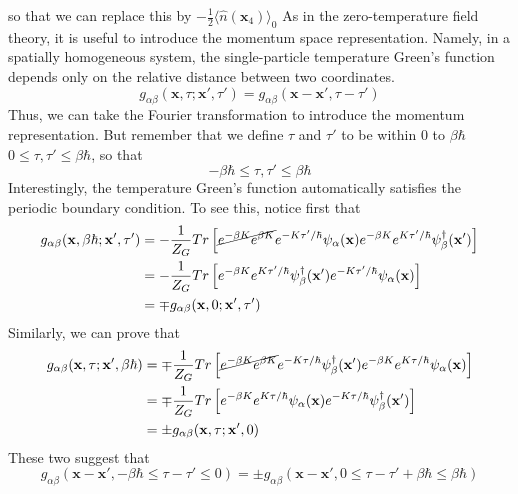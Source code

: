 so that we can replace this by $-\frac{1}{2}\langle\hat{n}(\mathbf{x}_4)\rangle_0$
As in the zero-temperature field theory, it is useful to introduce the momentum space representation.
Namely, in a spatially homogeneous system, the single-particle temperature Green's function depends only on the relative distance between two coordinates.
\begin{equation}
g_{\alpha\beta}(\mathbf{x},\tau;\mathbf{x}',\tau')=g_{\alpha\beta}(\mathbf{x}-\mathbf{x}',\tau-\tau')
\end{equation}
Thus, we can take the Fourier transformation to introduce the momentum representation.
But remember that we define $\tau$ and $\tau'$ to be within $0$ to $\beta\hbar$ $0\leq\tau,\tau'\leq\beta\hbar$, so that
\begin{equation}
-\beta\hbar\leq\tau,\tau'\leq\beta\hbar
\end{equation}
Interestingly, the temperature Green's function automatically satisfies the periodic boundary condition.
To see this, notice first that
\begin{equation}
\begin{aligned}
g_{\alpha\beta}(\mathbf{x},\beta\hbar;\mathbf{x}',\tau')&=-\frac{1}{Z_G}Tr\left[\cancel{e^{-\beta K} e^{\beta K}} e^{-K\tau'/\hbar}\psi_\alpha(\mathbf{x})e^{-\beta K} e^{K \tau'/\hbar} \psi_\beta^\dagger(\mathbf{x}')\right]\\
&=-\frac{1}{Z_G} Tr\left[e^{-\beta K} e^{K \tau'/\hbar} \psi_\beta^\dagger(\mathbf{x}')e^{-K \tau'/\hbar}\psi_\alpha(\mathbf{x})\right]\\
&=\mp g_{\alpha\beta} (\mathbf{x},0;\mathbf{x}',\tau')
\end{aligned}
\end{equation}
Similarly, we can prove that
\begin{equation}
\begin{aligned}
g_{\alpha\beta}(\mathbf{x},\tau;\mathbf{x}',\beta\hbar)&=\mp \frac{1}{Z_G} Tr\left[\cancel{e^{-\beta K} e^{\beta K}} e^{-K\tau/\hbar}\psi^\dagger_\beta(\mathbf{x}')e^{-\beta K} e^{K \tau/\hbar} \psi_\alpha (\mathbf{x})\right]\\
&=\mp\frac{1}{Z_G}Tr\left[e^{-\beta K} e^{K\tau/\hbar}\psi_\alpha(\mathbf{x}) e^{-K\tau/\hbar} \psi_\beta^\dagger(\mathbf{x}')\right]\\
&=\pm g_{\alpha\beta}(\mathbf{x},\tau;\mathbf{x}',0)
\end{aligned}
\end{equation}
These two suggest that
\begin{equation}
g_{\alpha\beta}(\mathbf{x}-\mathbf{x}',-\beta\hbar\le\tau-\tau'\le0)=\pm g_{\alpha\beta}(\mathbf{x}-\mathbf{x}',0\le\tau-\tau'+\beta\hbar\le\beta\hbar)
\end{equation}
